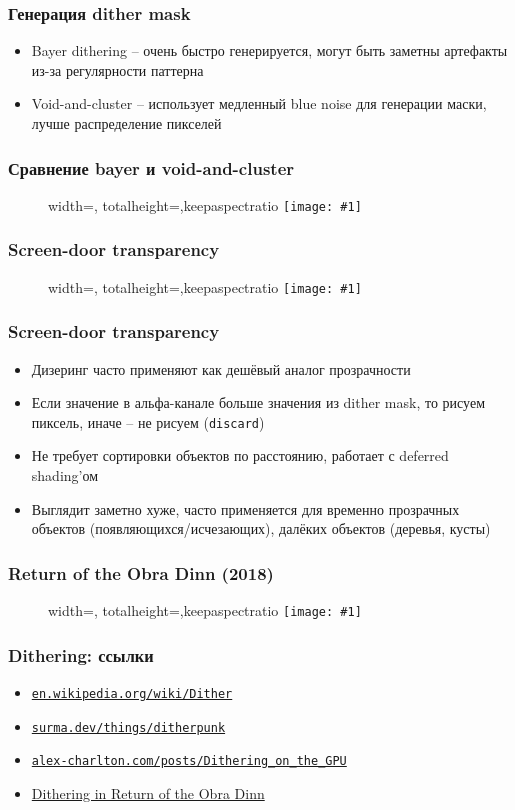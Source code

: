 \documentclass{beamer}
\newcommand{\slideimage}[1]{
  \begin{figure}
    \begin{adjustbox}{width=\textwidth, totalheight=\textheight-2\baselineskip-2\baselineskip,keepaspectratio}
      \texttt{[image: \#1]}
    \end{adjustbox}
  \end{figure}
}
\begin{document}
\begin{frame}[fragile]
\frametitle{Генерация dither mask}
\begin{itemize}
\item Bayer dithering -- очень быстро генерируется, могут быть заметны артефакты из-за регулярности паттерна
\pause
\item Void-and-cluster -- использует медленный blue noise для генерации маски, лучше распределение пикселей
\end{itemize}
\end{frame}

\begin{frame}[fragile]
\frametitle{Сравнение bayer и void-and-cluster}
\slideimage{dither-mask-compare.png}
\end{frame}

\begin{frame}[fragile]
\frametitle{Screen-door transparency}
\slideimage{dither-transparency.png}
\end{frame}

\begin{frame}[fragile]
\frametitle{Screen-door transparency}
\begin{itemize}
\item Дизеринг часто применяют как дешёвый аналог прозрачности
\pause
\item Если значение в альфа-канале больше значения из dither mask, то рисуем пиксель, иначе -- не рисуем (\verb|discard|)
\pause
\item Не требует сортировки объектов по расстоянию, работает с deferred shading'ом
\pause
\item Выглядит заметно хуже, часто применяется для временно прозрачных объектов (появляющихся/исчезающих), далёких объектов (деревья, кусты)
\end{itemize}
\end{frame}

\begin{frame}[fragile]
\frametitle{Return of the Obra Dinn (2018)}
\slideimage{obra-dinn.png}
\end{frame}

\begin{frame}[fragile]
\frametitle{Dithering: ссылки}
\begin{itemize}
\item \href{https://en.wikipedia.org/wiki/Dither}{\nolinkurl{en.wikipedia.org/wiki/Dither}}
\item \href{https://surma.dev/things/ditherpunk}{\nolinkurl{surma.dev/things/ditherpunk}}
\item \href{http://alex-charlton.com/posts/Dithering_on_the_GPU}{\nolinkurl{alex-charlton.com/posts/Dithering_on_the_GPU}}
\item \href{https://forums.tigsource.com/index.php?topic=40832.msg1363742}{Dithering in Return of the Obra Dinn}
\end{itemize}
\end{frame}
\end{document}
